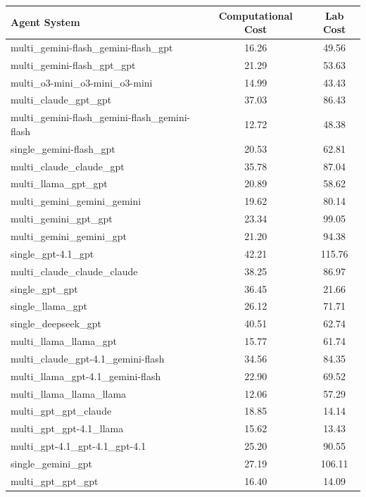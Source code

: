 \documentclass[manuscript, nonacm]{acmart}
\begin{document}
\begin{table}[h!]
\centering
\begin{tabular}{|l|c|c|}
\hline
\textbf{Agent System} & \textbf{Computational Cost} & \textbf{Lab Cost} \\
\hline
multi\_gemini-flash\_gemini-flash\_gpt & 16.26 & 49.56 \\
\hline
multi\_gemini-flash\_gpt\_gpt & 21.29 & 53.63 \\
\hline
multi\_o3-mini\_o3-mini\_o3-mini & 14.99 & 43.43 \\
\hline
multi\_claude\_gpt\_gpt & 37.03 & 86.43 \\
\hline
multi\_gemini-flash\_gemini-flash\_gemini-flash & 12.72 & 48.38 \\
\hline
single\_gemini-flash\_gpt & 20.53 & 62.81 \\
\hline
multi\_claude\_claude\_gpt & 35.78 & 87.04 \\
\hline
multi\_llama\_gpt\_gpt & 20.89 & 58.62 \\
\hline
multi\_gemini\_gemini\_gemini & 19.62 & 80.14 \\
\hline
multi\_gemini\_gpt\_gpt & 23.34 & 99.05 \\
\hline
multi\_gemini\_gemini\_gpt & 21.20 & 94.38 \\
\hline
single\_gpt-4.1\_gpt & 42.21 & 115.76 \\
\hline
multi\_claude\_claude\_claude & 38.25 & 86.97 \\
\hline
single\_gpt\_gpt & 36.45 & 21.66 \\
\hline
single\_llama\_gpt & 26.12 & 71.71 \\
\hline
single\_deepseek\_gpt & 40.51 & 62.74 \\
\hline
multi\_llama\_llama\_gpt & 15.77 & 61.74 \\
\hline
multi\_claude\_gpt-4.1\_gemini-flash & 34.56 & 84.35 \\
\hline
multi\_llama\_gpt-4.1\_gemini-flash & 22.90 & 69.52 \\
\hline
multi\_llama\_llama\_llama & 12.06 & 57.29 \\
\hline
multi\_gpt\_gpt\_claude & 18.85 & 14.14 \\
\hline
multi\_gpt\_gpt-4.1\_llama & 15.62 & 13.43 \\
\hline
multi\_gpt-4.1\_gpt-4.1\_gpt-4.1 & 25.20 & 90.55 \\
\hline
single\_gemini\_gpt & 27.19 & 106.11 \\
\hline
multi\_gpt\_gpt\_gpt & 16.40 & 14.09 \\
\hline

\end{tabular}
\end{table}
\end{document}
